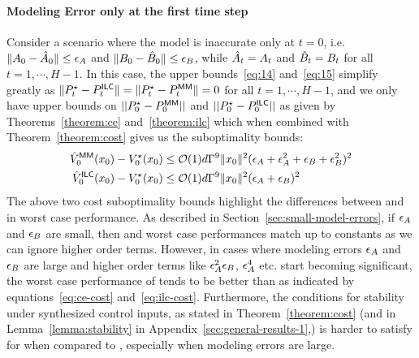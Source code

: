 \paragraph{Modeling Error only at the first time step}
\label{sec:modeling-error-only}

Consider a scenario where the model is inaccurate only at $t=0$,
i.e. $\|A_0 - \hat{A}_0\|\leq\epsilon_A$ and 
$\|B_0 - \hat{B}_0\|\leq\epsilon_B$, while $\hat{A}_t = A_t$ and $\hat{B}_t =
B_t$ for all $t=1, \cdots, H-1$. In this case, the upper
bounds~\eqref{eq:14} and~\eqref{eq:15} simplify greatly as $\|P^\star_t
- P^\mathsf{ILC}_t\| = \|P^\star_t - P^\mathsf{MM}_t\| = 0$ for all $t=1, \cdots, H-1$,
and we only have upper bounds on $||P^\star_0 - P^\mathsf{MM}_0||$ and $||P^\star_0
- P^\mathsf{ILC}_0||$ as given by Theorems~\ref{theorem:ce}
and~\ref{theorem:ilc} which when combined with
Theorem~\ref{theorem:cost} gives us the suboptimality bounds:
\begin{align}
  \hat{V}_0^{\mathsf{MM}}(x_0) - V_0^\star(x_0) &\leq
  \mathcal{O}(1)d\Gamma^9\|x_0\|^2(\epsilon_A + \epsilon_A^2 + \epsilon_B +
                                                \epsilon_B^2)^2 \label{eq:ce-cost}\\
  \hat{V}_0^{\mathsf{ILC}}(x_0) - V_0^\star(x_0) &\leq
  \mathcal{O}(1)d\Gamma^9\|x_0\|^2(\epsilon_A + \epsilon_B)^2\label{eq:ilc-cost}                                                
\end{align}
The above two cost suboptimality bounds highlight the differences
between \MM{} and \ILC{} in worst case performance. As described in
Section~\ref{sec:small-model-errors}, if $\epsilon_A$ and $\epsilon_B$ are
small, then \MM{} and \ILC{} worst case performances match up to constants as
we can ignore higher order terms.
However, in cases where modeling errors $\epsilon_A$ and $\epsilon_B$ are large
and higher order terms like $\epsilon_A^2\epsilon_B$, $\epsilon_A^4$ etc. start
becoming significant, the worst case performance of \ILC{} tends to be
better than \MM{} as indicated by equations~\eqref{eq:ce-cost}
and~\eqref{eq:ilc-cost}. Furthermore, the conditions for stability
under synthesized control inputs, as
stated in Theorem~\ref{theorem:cost} (and in
Lemma~\ref{lemma:stability} in Appendix~\ref{sec:general-results-1},) is harder to satisfy for \MM{}
when compared to \ILC{}, especially when modeling errors are large.

